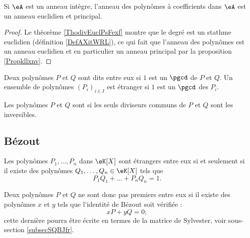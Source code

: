 \begin{corollary}
    Si \( \eA\) est un anneau intègre, l'anneau des polynômes à coefficients dans \( \eA\) est un anneau euclidien et principal.
\end{corollary}

\begin{proof}
    Le théorème \ref{ThodivEuclPsFexf} montre que le degré est un stathme euclidien (définition \ref{DefAXitWRL}), ce qui fait que l'anneau des polynômes est un anneau euclidien et en particulier un anneau principal par la proposition \ref{Propkllxnv}. 
\end{proof}

\begin{definition}  \label{DefDSFooZVbNAX}
Deux polynômes \( P\) et \( Q\) sont dits  entre eux si \( 1\) est un \( \pgcd\) de \( P\) et \( Q\). Un ensemble de polynômes \( (P_i)_{i\in I}\) est étranger  si \( 1\) est un \( \pgcd\) des \( P_i\).
    
Les polynômes \( P\) et \( Q\) sont  si les seuls diviseurs communs de \( P\) et \( Q\) sont les inversibles.
\end{definition}

\subsection{Bézout}

\begin{theorem}[Bézout] \label{ThoBezoutOuGmLB}     
    Les polynômes \( P_1,\ldots,P_n\) dans \( \eK[X]\) sont étrangers entre eux si et seulement si il existe des polynômes \( Q_1,\ldots,Q_n\in\eK[X]\) tels que
    \begin{equation}
        P_1Q_1+\ldots+P_nQ_n=1.
    \end{equation}
\end{theorem}

Deux polynômes \( P\) et \( Q\) ne sont donc pas premiers entre eux si il existe des polynômes \( x\) et \( y\) tels que l'identité de Bézout soit vérifiée :
\begin{equation}    \label{EqkbbzAi}
    xP+yQ=0;
\end{equation}
cette dernière pourra être écrite en termes de la matrice de Sylvester, voir sous-section \ref{subsecSQBJfr}.

